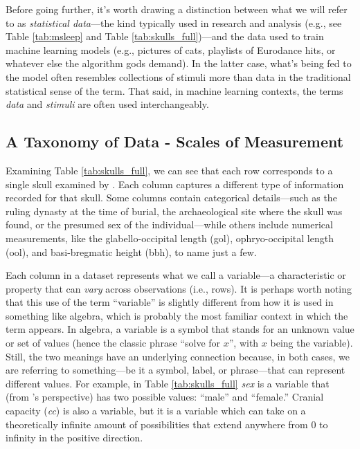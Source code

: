Before going further, it’s worth drawing a distinction between what we will refer to as \textit{statistical data}—the kind typically used in research and analysis (e.g., see Table \ref{tab:msleep} and Table \ref{tab:skulls_full})—and the data used to train machine learning models (e.g., pictures of cats, playlists of Eurodance hits, or whatever else the algorithm gods demand). In the latter case, what’s being fed to the model often resembles collections of stimuli more than data in the traditional statistical sense of the term. That said, in machine learning contexts, the terms \textit{data} and \textit{stimuli} are often used interchangeably.

\subsection{A Taxonomy of Data - Scales of Measurement}

Examining Table \ref{tab:skulls_full}, we can see that each row corresponds to a single skull examined by \textcite{Thomson1905}. Each column captures a different type of information recorded for that skull. Some columns contain categorical details—such as the ruling dynasty at the time of burial, the archaeological site where the skull was found, or the presumed sex of the individual—while others include numerical measurements, like the glabello-occipital length (gol), ophryo-occipital length (ool), and basi-bregmatic height (bbh), to name just a few.

Each column in a dataset represents what we call a variable—a characteristic or property that can \textit{vary} across observations (i.e., rows). It is perhaps worth noting that this use of the term ``variable'' is slightly different from how it is used in something like algebra, which is probably the most familiar context in which the term appears. In algebra, a variable is a symbol that stands for an unknown value or set of values (hence the classic phrase ``solve for $x$'', with $x$ being the variable). Still, the two meanings have an underlying connection because, in both cases, we are referring to something—be it a symbol, label, or phrase—that can represent different values. For example, in Table \ref{tab:skulls_full} \textit{sex} is a variable that (from \citeauthor{Thomson1905}'s perspective) has two possible values: ``male'' and ``female.''  Cranial capacity (\textit{cc}) is also a variable, but it is a variable which can take on a theoretically infinite amount of possibilities that extend anywhere from 0 to infinity in the positive direction.

